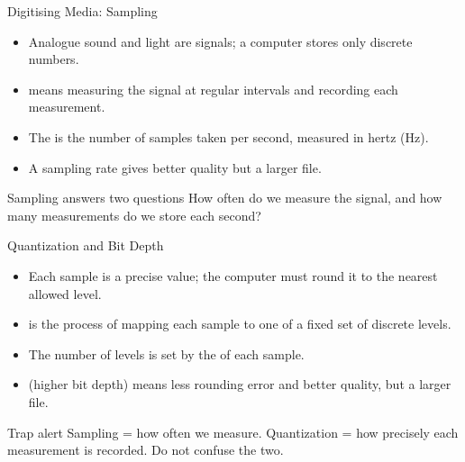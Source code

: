 \documentclass[aspectratio=169]{beamer}
\begin{document}
\begin{frame}{Digitising Media: Sampling}
  \begin{itemize}
    \item Analogue sound and light are  signals; a computer
      stores only discrete numbers.
    \item {} means measuring the signal at regular intervals and
      recording each measurement.
    \item The  is the number of samples taken per second,
      measured in hertz (Hz).
    \item A  sampling rate gives better quality but a larger file.
  \end{itemize}
  \begin{block}{Sampling answers two questions}
    How often do we measure the signal, and how many measurements do we store
    each second?
  \end{block}
\end{frame}

\begin{frame}{Quantization and Bit Depth}
  \begin{itemize}
    \item Each sample is a precise value; the computer must round it to the
      nearest allowed level.
    \item {} is the process of mapping each sample to one of a
      fixed set of discrete levels.
    \item The number of levels is set by the  of each sample.
    \item {} (higher bit depth) means less rounding error and
      better quality, but a larger file.
  \end{itemize}
  \begin{alertblock}{Trap alert}
    Sampling = how often we measure. Quantization = how precisely each
    measurement is recorded. Do not confuse the two.
  \end{alertblock}
\end{frame}
\end{document}
